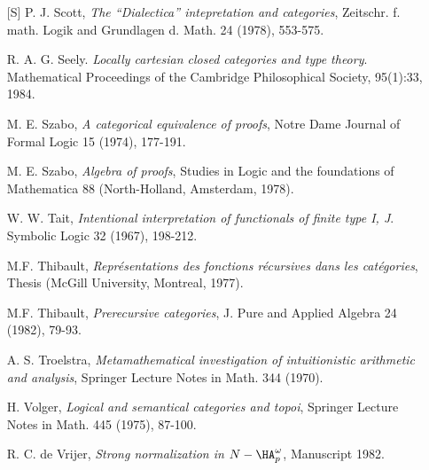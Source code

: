 \begin{enumerate}[leftmargin=*, widest=8888, align=left]
\item[{[S]}] P. J. Scott, {\em The ``Dialectica'' intepretation and categories}, Zeitschr.
f. math. Logik and Grundlagen d. Math. 24 (1978), 553-575.

\item[] R. A. G. Seely. {\em Locally cartesian closed categories and type theory}. Mathematical
Proceedings of the Cambridge Philosophical Society, 95(1):33, 1984.

\item[] M. E. Szabo, {\em A categorical equivalence of proofs}, Notre Dame Journal of
Formal Logic 15 (1974), 177-191.

\item[] M. E. Szabo, {\em Algebra of proofs}, Studies in Logic and the foundations of
Mathematica 88 (North-Holland, Amsterdam, 1978).

\item[] W. W. Tait, {\em Intentional interpretation of functionals of finite type I, J}.
Symbolic Logic 32 (1967), 198-212.

\item[] M.F. Thibault, {\em Repr\'esentations des fonctions r\'ecursives dans les cat\'egories},
Thesis (McGill University, Montreal, 1977).

\item[] M.F. Thibault, {\em Prerecursive categories}, J. Pure and Applied Algebra 24 (1982), 79-93.

\item[] A. S. Troelstra, {\em Metamathematical investigation of intuitionistic arithmetic
and analysis}, Springer Lecture Notes in Math. 344 (1970).

\item[] H. Volger, {\em Logical and semantical categories and topoi}, Springer Lecture
Notes in Math. 445 (1975), 87-100.

\item[] R. C. de Vrijer, {\em Strong normalization in $N - \HA_{p}^{\omega}$}, Manuscript 1982.
\end{enumerate}


